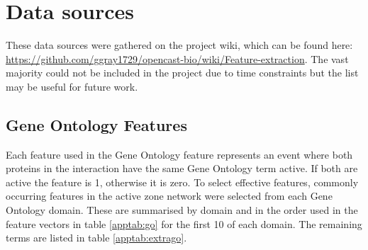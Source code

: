 \section{Data sources}
\label{datasources}

These data sources were gathered on the project wiki, which can be found here: \url{https://github.com/ggray1729/opencast-bio/wiki/Feature-extraction}.
The vast majority could not be included in the project due to time constraints but the list may be useful for future work.


\subsection{Gene Ontology Features}
\label{app:go}

Each feature used in the Gene Ontology feature represents an event where both proteins in the interaction have the same Gene Ontology term active.
If both are active the feature is 1, otherwise it is zero.
To select effective features, commonly occurring features in the active zone network were selected from each Gene Ontology domain.
These are summarised by domain and in the order used in the feature vectors in table \ref{apptab:go} for the first 10 of each domain.
The remaining terms are listed in table \ref{apptab:extrago}.

